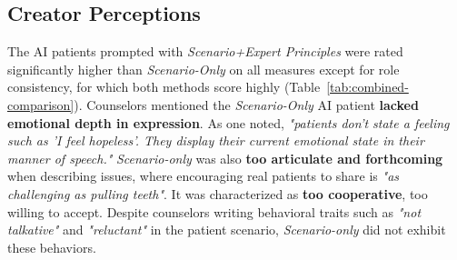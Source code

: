 \documentclass[11pt]{article}
\begin{document}
  
\subsection{Creator Perceptions}\label{sec:firstparty}
The AI patients prompted with \textit{Scenario+Expert Principles} were rated significantly higher than \textit{Scenario-Only} on all measures except for role consistency, for which both methods score highly (Table~\ref{tab:combined-comparison}).
Counselors mentioned the \textit{Scenario-Only} AI patient \textbf{lacked emotional depth in expression}. As one noted, \textit{"patients don't state a feeling such as 'I feel hopeless'. They display their current emotional state in their manner of speech."} \textit{Scenario-only} was also \textbf{too articulate and forthcoming} when describing issues, where encouraging real patients to share is \textit{"as challenging as pulling teeth"}. It was characterized as \textbf{too cooperative}, too willing to accept. Despite counselors writing behavioral traits such as \textit{"not talkative"} and \textit{"reluctant"} in the patient scenario, \textit{Scenario-only} did not exhibit these behaviors.

\end{document}
